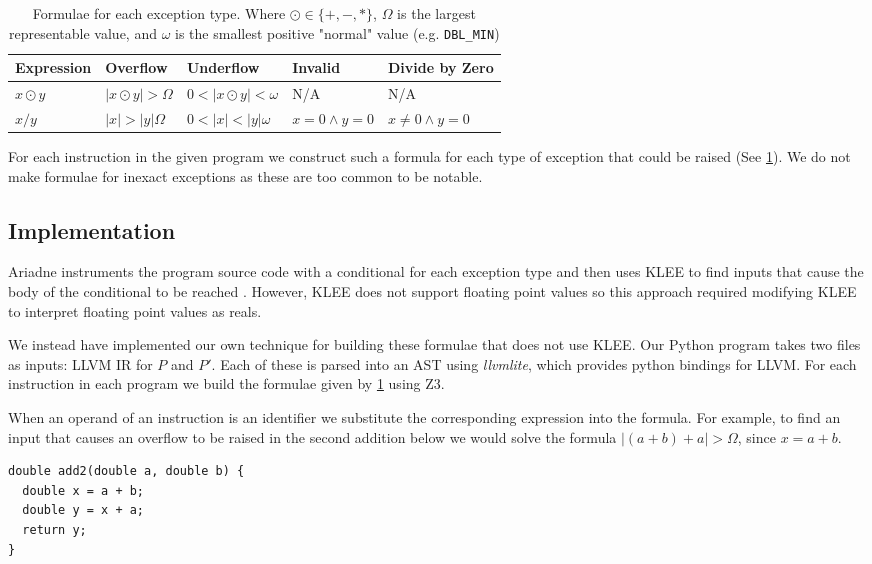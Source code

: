 \documentclass{article}
\begin{document}
\begin{table}[h]
\begin{tabular}{lllll}
Expression  & Overflow             & Underflow & Invalid & Divide by Zero \\ \hline
$x \odot y$ & $|x \odot y| > \Omega$ & $0 < |x \odot y| < \omega$ & N/A & N/A \\
$x / y$     & $|x| > |y| \Omega$     & $0 < |x| < |y| \omega $ &
  $x = 0 \land y = 0$ & $x \neq 0 \land y = 0$ \\
\end{tabular}
\caption{Formulae for each exception type. Where $\odot \in \{+, -, *\}$,
  $\Omega$ is the largest representable value, and $\omega$ is the smallest
  positive "normal" value (e.g. \texttt{DBL\_MIN})}
\label{table:formulae}
\end{table}

For each instruction in the given program we construct such a formula for each
type of exception that could be raised (See \ref{table:formulae}). We do not
make formulae for inexact exceptions as these are too common to be notable.

\subsection{Implementation}

Ariadne instruments the program source code with a conditional for each
exception type and then uses KLEE to find inputs that cause the body of the
conditional to be reached \cite[3-4]{barr_automatic_2013}. However, KLEE does
not support floating point values so this approach required modifying KLEE to
interpret floating point values as reals\cite[2]{barr_automatic_2013}.

We instead have implemented our own technique for building these formulae that
does not use KLEE. Our Python program takes two files as inputs: LLVM IR for $P$
and $P'$. Each of these is parsed into an AST using \textit{llvmlite}, which
provides python bindings for LLVM. For each instruction in each program we build
the formulae given by \ref{table:formulae} using Z3.

When an operand of an instruction is an identifier we substitute the
corresponding expression into the formula. For example, to find an input that
causes an overflow to be raised in the second addition below we would solve the
formula $|(a + b) + a| > \Omega$, since $x = a + b$.

\begin{lstlisting}
double add2(double a, double b) {
  double x = a + b;
  double y = x + a;
  return y;
}
\end{lstlisting}
\end{document}
